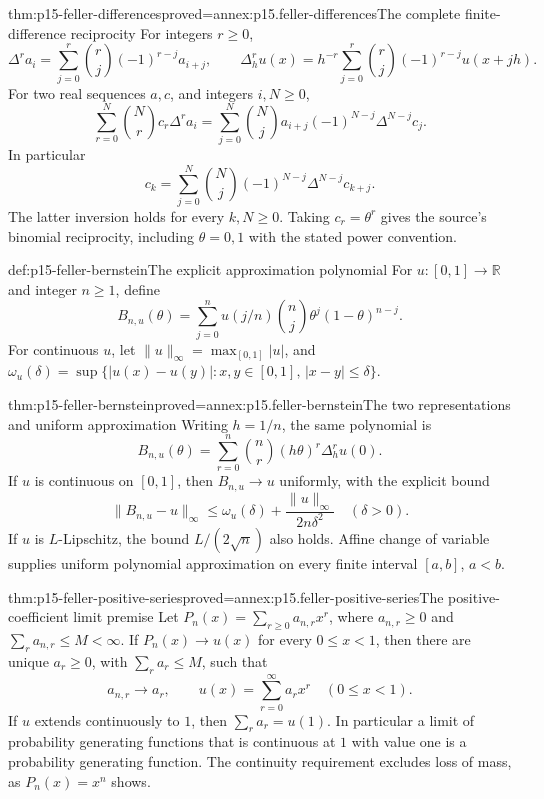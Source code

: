 \begin{hbtheorem}{thm:p15-feller-differences}{proved=annex:p15.feller-differences}{The complete finite-difference reciprocity}
For integers \(r\geq0\),
\[
 \Delta^r a_i=\sum_{j=0}^r\binom rj(-1)^{r-j}a_{i+j},
 \qquad
 \Delta_h^r u(x)=h^{-r}\sum_{j=0}^r\binom rj(-1)^{r-j}u(x+jh).
\]
For two real sequences \(a,c\), and integers \(i,N\geq0\),
\[
 \sum_{r=0}^N\binom Nr c_r\Delta^r a_i
   =\sum_{j=0}^N\binom Nj a_{i+j}(-1)^{N-j}\Delta^{N-j}c_j.
\]
In particular
\[
                c_k=\sum_{j=0}^N\binom Nj(-1)^{N-j}
                                            \Delta^{N-j}c_{k+j}.
\]
The latter inversion holds for every \(k,N\geq0\).
Taking \(c_r=\theta^r\) gives the source's binomial reciprocity,
including \(\theta=0,1\) with the stated power convention.
\end{hbtheorem}

\begin{hbdefinition}{def:p15-feller-bernstein}{The explicit approximation polynomial}
For \(u:[0,1]\to\mathbb R\) and integer \(n\geq1\), define
\[
 B_{n,u}(\theta)=
      \sum_{j=0}^n u(j/n)\binom nj\theta^j(1-\theta)^{n-j}.
\]
For continuous \(u\), let
\(\|u\|_\infty=\max_{[0,1]}|u|\), and
\(\omega_u(\delta)=\sup\{|u(x)-u(y)|:x,y\in[0,1],\,|x-y|\leq\delta\}\).
\end{hbdefinition}

\begin{hbtheorem}{thm:p15-feller-bernstein}{proved=annex:p15.feller-bernstein}{The two representations and uniform approximation}
Writing \(h=1/n\), the same polynomial is
\[
                   B_{n,u}(\theta)
                       =\sum_{r=0}^n\binom nr(h\theta)^r\Delta_h^ru(0).
\]
If \(u\) is continuous on \([0,1]\), then \(B_{n,u}\to u\)
uniformly, with the explicit bound
\[
 \|B_{n,u}-u\|_\infty
        \leq\omega_u(\delta)+\frac{\|u\|_\infty}{2n\delta^2}
                                         \quad(\delta>0).
\]
If \(u\) is \(L\)-Lipschitz, the bound \(L/(2\sqrt n)\) also holds.
Affine change of variable supplies uniform polynomial approximation on
every finite interval \([a,b]\), \(a<b\).
\end{hbtheorem}

\begin{hblemma}{thm:p15-feller-positive-series}{proved=annex:p15.feller-positive-series}{The positive-coefficient limit premise}
Let
\(P_n(x)=\sum_{r\geq0}a_{n,r}x^r\), where \(a_{n,r}\geq0\) and
\(\sum_r a_{n,r}\leq M<\infty\).
If \(P_n(x)\to u(x)\) for every \(0\leq x<1\), then there are
unique \(a_r\geq0\), with \(\sum_r a_r\leq M\), such that
\[
                      a_{n,r}\to a_r,\qquad
                      u(x)=\sum_{r=0}^\infty a_rx^r\quad(0\leq x<1).
\]
If \(u\) extends continuously to \(1\), then \(\sum_r a_r=u(1)\).
In particular a limit of probability generating functions that is
continuous at \(1\) with value one is a probability generating function.
The continuity requirement excludes loss of mass, as \(P_n(x)=x^n\)
shows.
\end{hblemma}

